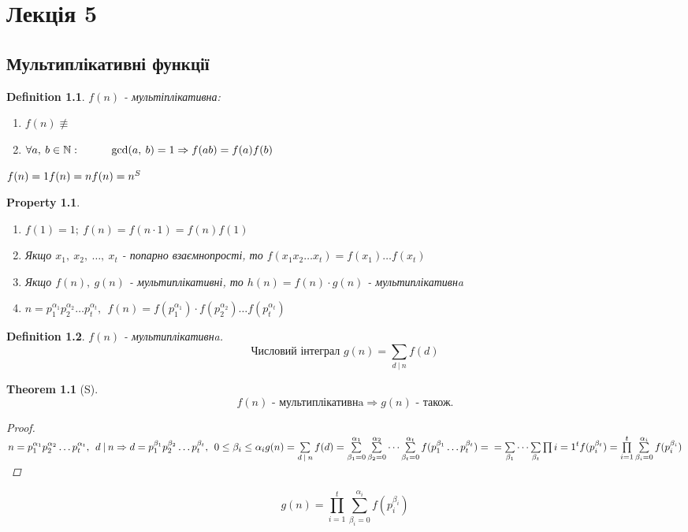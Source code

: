 \documentclass[a4paper,12pt, centered]{bookest}
\newtheorem{theorem}{Theorem}[section]
\newtheorem{definition}{Definition}[section]
\newtheorem*{property*}{Property}
\newcommand\tab[1][1cm]{\hspace*{#1}}
\begin{document}
\chapter{Лекція 5}
\section{Мультиплікативні функції}
\begin{definition}$f(n)$ - мультіплікативна:
	\begin{enumerate}
	\item $f(n)\not\equiv$
	\item $\forall a,\>b\in\mathbb{N}:\tab \gcd(a,\>b)=1\Rightarrow f(ab)=f(a)f(b)$
\end{enumerate}
\end{definition}
\begin{example}
$\\f(n)=1\\f(n)=n\\f(n)=n^S$	
\end{example}
\begin{property*}$ $
	\begin{enumerate}
		\item $f(1)=1;\>f(n)=f(n\cdot 1)=f(n)f(1)$
		\item Якщо $x_1,\>x_2,\>\dots,\>x_t$ - попарно взаємнопрості, то $f(x_1 x_2 \dots x_t)=f(x_1)\dots f(x_t)$ 
		\item Якщо $f(n),\>g(n)$ - мультиплікативні, то $h(n)=f(n)\cdot g(n)$ -  мультиплікативнa
		\item $n=p_1^{\alpha_1}p_2^{\alpha_2}\dots p_t^{\alpha_t},\>\>f(n)=f(p_1^{\alpha_1})\cdot f(p_2^{\alpha_2})\dots f(p_t^{\alpha_t})$
	\end{enumerate}
\end{property*}
\begin{definition}
	$f(n)$ - мультиплікативнa. $$\textrm{Числовий інтеграл }g(n)=\sum\limits_{d\>|\>n}f(d)$$
\end{definition}
\begin{theorem}[S]
\label{S}
	$$f(n)\textrm{ - мультиплікативнa}\Rightarrow g(n) \textrm{ - також.}$$
	\begin{proof}
		$\\n=p_1^{\alpha_1}p_2^{\alpha_2}\dots p_t^{\alpha_t},\>\> d\>|\>n\Rightarrow d=p_1^{\beta_1}p_2^{\beta_2}\dots p_t^{\beta_t},\>\>0\leq \beta_i\leq\alpha_i\\g(n)= \sum\limits_{d\>|\>n}f(d)=\sum\limits_{\beta_1=0}^{\alpha_1}\sum\limits_{\beta_2=0}^{\alpha_2}\dots\sum\limits_{\beta_t=0}^{\alpha_t}f(p_1^{\beta_1}\dots p_t^{\beta_t})=\\=\sum\limits_{\beta_1}\dots\sum\limits_{\beta_t}\prod\limits{i=1}^{t}f(p_i^{\beta_t})=\prod\limits_{i=1}^{t}\sum\limits_{\beta_i=0}^{\alpha_i}f(p_i^{\beta_i})$
	\end{proof}
\end{theorem}
$$g(n)=\prod\limits_{i=1}^{t}\sum\limits_{\beta_i=0}^{\alpha_i}f(p_i^{\beta_i})$$
\end{document}
